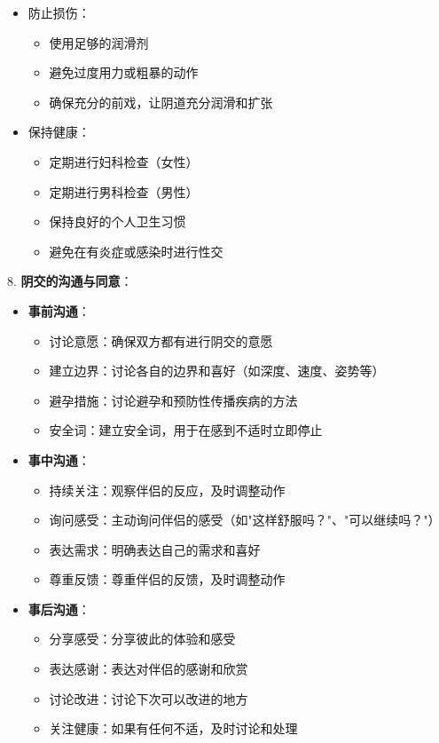 \documentclass[12pt,UTF8]{ctexbook}
\begin{document}
\begin{itemize}
\begin{itemize}
\begin{itemize}
			\item 正确使用避孕措施
			\item 考虑使用双重避孕（如避孕套+避孕药）
		\end{itemize}
		\item 防止损伤：
		\begin{itemize}
			\item 使用足够的润滑剂
			\item 避免过度用力或粗暴的动作
			\item 确保充分的前戏，让阴道充分润滑和扩张
		\end{itemize}
		\item 保持健康：
		\begin{itemize}
			\item 定期进行妇科检查（女性）
			\item 定期进行男科检查（男性）
			\item 保持良好的个人卫生习惯
			\item 避免在有炎症或感染时进行性交
		\end{itemize}
	\end{itemize}
\end{itemize}

8. \textbf{阴交的沟通与同意}：
\begin{itemize}
	\item \textbf{事前沟通}：
	\begin{itemize}
		\item 讨论意愿：确保双方都有进行阴交的意愿
		\item 建立边界：讨论各自的边界和喜好（如深度、速度、姿势等）
		\item 避孕措施：讨论避孕和预防性传播疾病的方法
		\item 安全词：建立安全词，用于在感到不适时立即停止
	\end{itemize}
	\item \textbf{事中沟通}：
	\begin{itemize}
		\item 持续关注：观察伴侣的反应，及时调整动作
		\item 询问感受：主动询问伴侣的感受（如"这样舒服吗？"、"可以继续吗？"）
		\item 表达需求：明确表达自己的需求和喜好
		\item 尊重反馈：尊重伴侣的反馈，及时调整动作
	\end{itemize}
	\item \textbf{事后沟通}：
	\begin{itemize}
		\item 分享感受：分享彼此的体验和感受
		\item 表达感谢：表达对伴侣的感谢和欣赏
		\item 讨论改进：讨论下次可以改进的地方
		\item 关注健康：如果有任何不适，及时讨论和处理
	\end{itemize}
\end{itemize}
\end{document}
